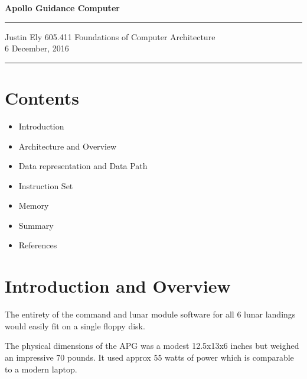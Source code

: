 \documentclass[a4paper,11pt]{article}
\begin{document}
\begin{flushright}

\vspace{1.1cm}

{\bf\Huge Apollo Guidance Computer}

\rule{0.25\linewidth}{0.5pt}

\vspace{0.5cm}
Justin Ely
\linebreak
\newline
\footnotesize{605.411 Foundations of Computer Architecture \\}
\vspace{0.5cm}
6 December, 2016
\end{flushright}

\noindent\rule{\linewidth}{1.0pt}



\section{Contents}
\begin{itemize}
\item Introduction %
\item Architecture and Overview
\item Data representation and Data Path
\item Instruction Set
\item Memory
\item Summary
\item References
\end{itemize}


\section{Introduction and Overview}

The entirety of the command and lunar module software for all 6 lunar landings would easily fit on a single floppy disk.  

The physical dimensions of the APG was a modest 12.5x13x6 inches but weighed an impressive 70 pounds.  It used approx 55 watts of power which is comparable to a modern laptop.

\end{document}
